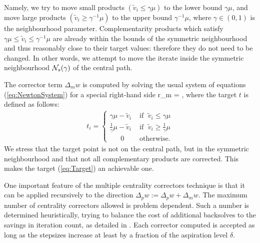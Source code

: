 Namely, we try to move small products 
$(\tilde v_i \leq \gamma \mu)$ to the lower bound $\gamma \mu$, and move 
large products $(\tilde v_i \geq \gamma^{-1} \mu)$ 
to the upper bound $\gamma^{-1} \mu$, where $\gamma \in (0,1)$
is the neighbourhood parameter.
Complementarity products 
which satisfy $\gamma \mu \leq \tilde v_i \leq \gamma^{-1} \mu$ are
already within the bounds of the symmetric neighbourhood and thus
reasonably close to their target values: therefore they
do not need to be changed. 
In other words, we attempt to move the iterate inside the symmetric
neighbourhood $\mathcal{N}_s(\gamma)$ of the central path.

The corrector term $\Delta_m w$ is computed by solving the usual 
system of equations (\ref{eq:NewtonSystem}) for a special right-hand side
\be  \label{eq:MCCRhs}
  r_m = \left[
   \begin{array}{c}
     0 \\ 0 \\ t
   \end{array} \right],
\ee
where the target $t$ is defined as follows:
%
\begin{eqnarray} \label{eq:Target}
  t_i = \left\{
  \begin{array}{ll}
    \gamma \mu - \tilde v_i 
    & \mbox{ if } \; \tilde v_i \leq \gamma \mu  \\
    \frac{1}{\gamma} \mu - \tilde v_i 
    & \mbox{ if } \; \tilde v_i \geq \frac{1}{\gamma} \mu  \\
    \quad\;\; 0    
    & \mbox{ otherwise.}
  \end{array}
  \right.
\end{eqnarray}
We stress that the target point is not on the central path, 
but in the symmetric neighbourhood and that not all complementary
products are corrected. This makes the target (\ref{eq:Target})
an achievable one.

One important feature of the multiple centrality correctors technique
is that it can be applied recursively to the direction 
$\Delta_p w := \Delta_p w + \Delta_m w$.
The maximum number of centrality correctors allowed is
problem dependent. Such a number is determined 
heuristically, trying to balance the cost of additional backsolves to 
the savings in iteration count, as detailed in \cite{Gondzio96}.
Each corrector computed is accepted as long as the stepsizes increase 
at least by a fraction of the aspiration level $\delta$.


